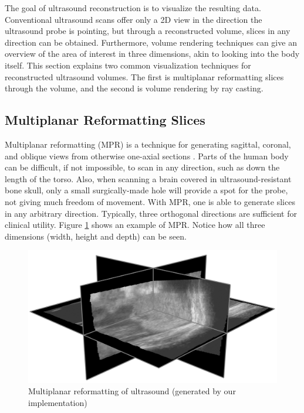 The goal of ultrasound reconstruction is to visualize the resulting data. Conventional ultrasound scans offer only a 2D view in the direction the ultrasound probe is pointing, but through a reconstructed volume, slices in any direction can be obtained. Furthermore, volume rendering techniques can give an overview of the area of interest in three dimensions, akin to looking into the body itself. This section explains two common visualization techniques for reconstructed ultrasound volumes. The first is multiplanar reformatting slices through the volume, and the second is volume rendering by ray casting.

\subsection{Multiplanar Reformatting Slices}

	Multiplanar reformatting (MPR) is a technique for generating sagittal, coronal, and oblique views from otherwise one-axial sections \cite{preim2007, fenster2002}. Parts of the human body can be difficult, if not impossible, to scan in any direction, such as down the length of the torso. Also, when scanning a brain covered in ultrasound-resistant bone skull, only a small surgically-made hole will provide a spot for the probe, not giving much freedom of movement. With MPR, one is able to generate slices in any arbitrary direction. Typically, three orthogonal directions are sufficient for clinical utility. Figure \ref{fig:mpr_slices} shows an example of MPR. Notice how all three dimensions (width, height and depth) can be seen.
	
	\begin{figure}[h]
	\centering
	\includegraphics[height=0.3\textheight]{graphics/mpr_slices.png}
	\caption[Multiplanar reformatting of ultrasound]{Multiplanar reformatting of ultrasound (generated by our implementation)}
	\label{fig:mpr_slices}
	\end{figure}
	
